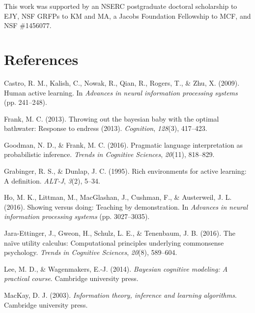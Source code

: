 \documentclass[10pt, letterpaper]{article}
\begin{document}
This work was supported by an NSERC postgraduate doctoral scholarship to
EJY, NSF GRFPs to KM and MA, a Jacobs Foundation Fellowship to MCF, and
NSF \#1456077.

\hypertarget{references}{%
\section{References}\label{references}}

\setlength{\parindent}{-0.1in} 
\setlength{\leftskip}{0.125in}

\noindent

\hypertarget{refs}{}
\leavevmode\hypertarget{ref-castro2009human}{}%
Castro, R. M., Kalish, C., Nowak, R., Qian, R., Rogers, T., \& Zhu, X.
(2009). Human active learning. In \emph{Advances in neural information
processing systems} (pp. 241--248).

\leavevmode\hypertarget{ref-frank2013throwing}{}%
Frank, M. C. (2013). Throwing out the bayesian baby with the optimal
bathwater: Response to endress (2013). \emph{Cognition}, \emph{128}(3),
417--423.

\leavevmode\hypertarget{ref-goodman2016}{}%
Goodman, N. D., \& Frank, M. C. (2016). Pragmatic language
interpretation as probabilistic inference. \emph{Trends in Cognitive
Sciences}, \emph{20}(11), 818--829.

\leavevmode\hypertarget{ref-grabinger1995rich}{}%
Grabinger, R. S., \& Dunlap, J. C. (1995). Rich environments for active
learning: A definition. \emph{ALT-J}, \emph{3}(2), 5--34.

\leavevmode\hypertarget{ref-ho2016showing}{}%
Ho, M. K., Littman, M., MacGlashan, J., Cushman, F., \& Austerweil, J.
L. (2016). Showing versus doing: Teaching by demonstration. In
\emph{Advances in neural information processing systems} (pp.
3027--3035).

\leavevmode\hypertarget{ref-jara2016}{}%
Jara-Ettinger, J., Gweon, H., Schulz, L. E., \& Tenenbaum, J. B. (2016).
The naïve utility calculus: Computational principles underlying
commonsense psychology. \emph{Trends in Cognitive Sciences},
\emph{20}(8), 589--604.

\leavevmode\hypertarget{ref-lee2014bayesian}{}%
Lee, M. D., \& Wagenmakers, E.-J. (2014). \emph{Bayesian cognitive
modeling: A practical course}. Cambridge university press.

\leavevmode\hypertarget{ref-mackay2003}{}%
MacKay, D. J. (2003). \emph{Information theory, inference and learning
algorithms}. Cambridge university press.
\end{document}
